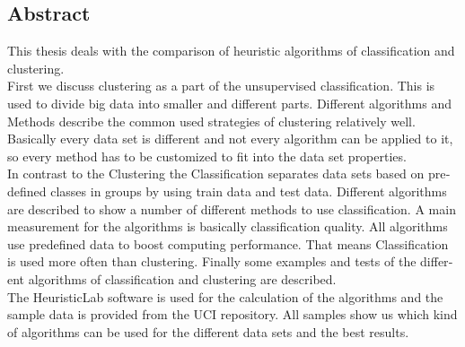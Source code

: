 \begin{english}
\chapter{Abstract}
This thesis deals with the comparison of heuristic algorithms of classification and clustering.\\
First we discuss clustering as a part of the unsupervised classification. This is used to divide big data into smaller and different parts.
Different algorithms and Methods describe the common used strategies of clustering relatively well. Basically every data set is different and not every algorithm can be applied to it, so every method has to be customized to fit into the data set properties.\\
In contrast to the Clustering the Classification separates data sets based on predefined classes in groups by using train data and test data. 
Different algorithms are described to show a number of different methods to use classification. 
A main measurement for the algorithms is basically classification quality. 
All algorithms use predefined data to boost computing performance. That means Classification is used more often than clustering. Finally some examples and tests of the different algorithms of classification and clustering are described.\\
The HeuristicLab software is used for the calculation of the algorithms and the sample data is provided from the UCI repository. All samples show us which kind of algorithms can be used for the different data sets and the best results.
\end{english}